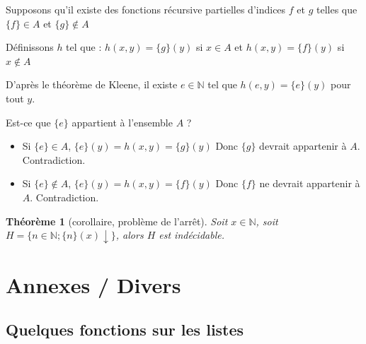 \documentclass[11pt]{book}
\newtheorem{theoreme}{Théorème}
\begin{document}
Supposons qu'il existe  des fonctions récursive partielles d'indices $f$ et $g$ telles que $\{f\}\in A$
 et $\{g\} \notin A$ 

Définissons $h$ tel que :
$h(x,y)=\{g\}(y)$ si $x \in A$ et 
$h(x,y)=\{f\}(y)$ si $x \notin A$  

D'après le théorème de Kleene, il existe $e \in \mathbb{N}$ tel que $h(e,y)=\{ e \}(y)$ pour tout $y$.

Est-ce que $\{ e \}$ appartient à l'ensemble $A$ ?

\begin{itemize}
	\item Si $\{e\} \in A$, $\{e\}(y)=h(x,y)=\{g\}(y)$ 
	Donc $\{g\}$ devrait appartenir à $A$. Contradiction.

	\item Si $\{e\} \notin A$, $\{e\}(y)=h(x,y)=\{f\}(y)$ 
	Donc $\{ f\}$ ne devrait appartenir à $A$. Contradiction.
\end{itemize}

\begin{theoreme}[corollaire, problème de l'arrêt] 
Soit $x \in \mathbb{N}$, soit $H=\{ n\in \mathbb{N}; \{n\}(x) \downarrow \}$, alors $H$ est indécidable.
\end{theoreme}
\chapter{Annexes / Divers}
\section{Quelques fonctions sur les listes}
 
\end{document}
